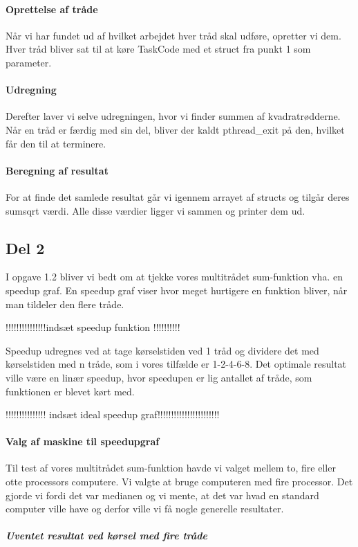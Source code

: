 \paragraph{Oprettelse af tråde} Når vi har fundet ud af hvilket arbejdet hver tråd skal udføre, opretter vi dem. Hver tråd bliver sat til at køre TaskCode med et struct fra punkt 1 som parameter.
\paragraph{Udregning} Derefter laver vi selve udregningen, hvor vi finder summen af kvadratrødderne. Når en tråd er færdig med sin del, bliver der kaldt pthread\_exit på den, hvilket får den til at terminere.
\paragraph{Beregning af resultat} For at finde det samlede resultat går vi igennem arrayet af structs og tilgår deres sumsqrt værdi. Alle disse værdier ligger vi sammen og printer dem ud.

\subsection{Del 2}
\label{O1_2}
I opgave 1.2 bliver vi bedt om at tjekke vores multitrådet sum-funktion vha. en speedup graf.
En speedup graf viser hvor meget hurtigere en funktion bliver, når man tildeler den flere tråde. 

!!!!!!!!!!!!!!!indsæt speedup funktion !!!!!!!!!!

Speedup udregnes ved at tage kørselstiden ved 1 tråd og dividere det med kørselstiden med n tråde, som i vores tilfælde er 1-2-4-6-8. Det optimale resultat ville være en linær speedup, hvor speedupen er lig antallet af tråde, som funktionen er blevet kørt med.


!!!!!!!!!!!!!!! indsæt ideal speedup graf!!!!!!!!!!!!!!!!!!!!!!!

\paragraph{Valg af maskine til speedupgraf}
Til test af vores multitrådet sum-funktion havde vi valget mellem to, fire eller otte processors computere. Vi valgte at bruge computeren med fire processor. Det gjorde vi fordi det var medianen og vi mente, at det var hvad en standard computer ville have og derfor ville vi få nogle generelle resultater. 

\subparagraph{Uventet resultat ved kørsel med fire tråde}


